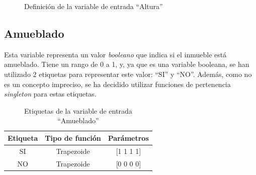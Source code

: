 \documentclass[12pt]{report} %
\begin{document}
        \begin{figure}[H]
            \centering
            \caption{Definición de la variable de entrada ``Altura''}
        \end{figure}

        \subsection{Amueblado}
        Esta variable representa un valor \textit{booleano} que indica si el inmueble está amueblado.
        Tiene un rango de 0 a 1, y, ya que es una variable booleana, se han utilizado 2 etiquetas para representar este valor: ``SI'' y ``NO''.
        Además, como no es un concepto impreciso, se ha decidido utilizar funciones de pertenencia \textit{singleton} para estas etiquetas.

        \begin{table}[h]
            \center
            \begin{tabular}{@{}ccc@{}}
                \toprule
                \textbf{Etiqueta} & \textbf{Tipo de función} & \textbf{Parámetros} \\
                \midrule
                SI & Trapezoide & [1 1 1 1] \\
                NO & Trapezoide & [0 0 0 0] \\
                \bottomrule
            \end{tabular}
            \caption{Etiquetas de la variable de entrada ``Amueblado''}
        \end{table}
\end{document}
